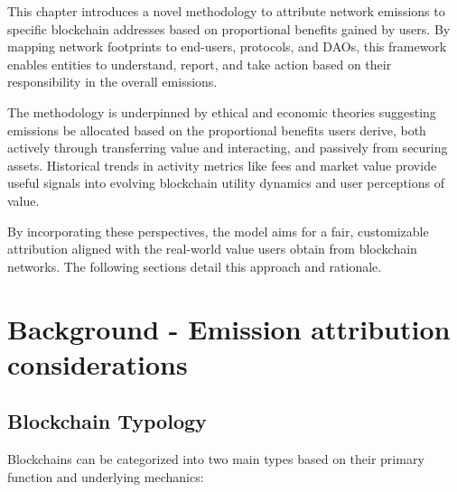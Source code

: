 \documentclass[11pt]{report}
\begin{document}
This chapter introduces a novel methodology to attribute network emissions to specific blockchain addresses based on proportional benefits gained by users. By mapping network footprints to end-users, protocols, and DAOs, this framework enables entities to understand, report, and take action based on their responsibility in the overall emissions.

The methodology is underpinned by ethical and economic theories suggesting emissions be allocated based on the proportional benefits users derive, both actively through transferring value and interacting, and passively from securing assets. Historical trends in activity metrics like fees and market value provide useful signals into evolving blockchain utility dynamics and user perceptions of value.

By incorporating these perspectives, the model aims for a fair, customizable attribution aligned with the real-world value users obtain from blockchain networks. The following sections detail this approach and rationale.

\section{Background - Emission attribution considerations}

\subsection{Blockchain Typology}
Blockchains can be categorized into two main types based on their primary function and underlying mechanics:
\end{document}
